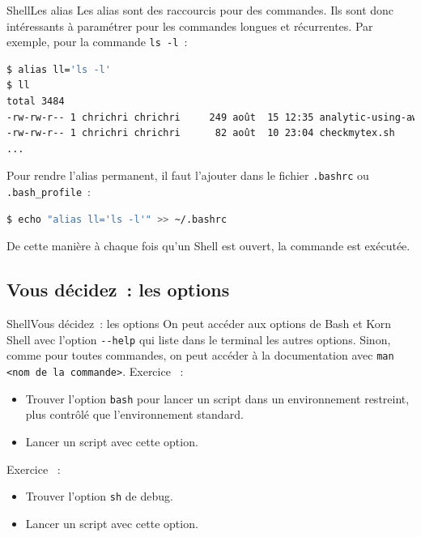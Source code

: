 \documentclass{beamer}
\begin{document}
    \begin{frame}[fragile]{Shell}{Les alias}
        Les alias sont des raccourcis pour des commandes.
        Ils sont donc intéressants à paramétrer pour les commandes longues et récurrentes.
        \bigbreak
        Par exemple, pour la commande \lstinline{ls -l}~:
        \begin{lstlisting}[language=bash]
$ alias ll='ls -l'
$ ll
total 3484
-rw-rw-r-- 1 chrichri chrichri     249 août  15 12:35 analytic-using-awk.sh
-rw-rw-r-- 1 chrichri chrichri      82 août  10 23:04 checkmytex.sh
...
        \end{lstlisting}
        \bigbreak
        Pour rendre l'alias permanent, il faut l'ajouter dans le fichier \lstinline{.bashrc} ou \lstinline{.bash_profile}~:
        \begin{lstlisting}[language=bash]
$ echo "alias ll='ls -l'" >> ~/.bashrc
        \end{lstlisting}
        De cette manière à chaque fois qu'un Shell est ouvert, la commande est exécutée.
    \end{frame}

    \subsection{Vous décidez~: les options}\label{subsec:shell-options}

    \begin{frame}[fragile]{Shell}{Vous décidez~: les options}
        On peut accéder aux options de Bash et Korn Shell avec l'option \lstinline{--help} qui liste dans le terminal les autres options.
        \bigbreak
        Sinon, comme pour toutes commandes, on peut accéder à la documentation avec \lstinline{man <nom de la commande>}.
        \bigbreak
        Exercice \execcounterdispinc~:
        \begin{itemize}
            \item Trouver l'option \lstinline{bash} pour lancer un script dans un environnement restreint, plus contrôlé que l'environnement standard.
            \item Lancer un script avec cette option.
        \end{itemize}
        Exercice \execcounterdispinc~:
        \begin{itemize}
            \item Trouver l'option \lstinline{sh} de debug.
            \item Lancer un script avec cette option.
        \end{itemize}
    \end{frame}
\end{document}
